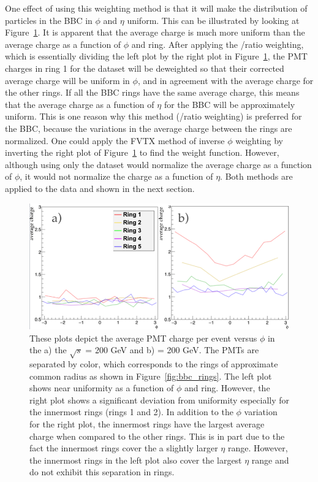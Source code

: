 One effect of using this weighting method is that it will make the distribution of particles in the BBC in $\phi$ and $\eta $ uniform. This can be illustrated by looking at Figure~\ref{fig:bbc_pmt_phi_pp_pau}. It is apparent that the \pp average charge is much more uniform than the \pau average charge as a function of $\phi$ and ring. After applying the \pp/\pau ratio weighting, which is essentially dividing the left plot by the right plot in Figure~\ref{fig:bbc_pmt_phi_pp_pau}, the PMT charges in ring 1 for the \pau dataset will be deweighted so that their corrected average charge will be uniform in $\phi$, and in agreement with the average charge for the other rings. If all the BBC rings have the same average charge, this means that the average charge as a function of $\eta$ for the BBC will be approximately uniform. This is one reason why this method (\pp/\pau ratio weighting) is preferred for the BBC, because the variations in the average charge between the rings are normalized. One could apply the FVTX method of inverse $\phi$ weighting by inverting the right plot of Figure~\ref{fig:bbc_pmt_phi_pp_pau} to find the weight function. However, although using only the \pau dataset would normalize the average charge as a function of $\phi$, it would not normalize the charge as a function of $\eta$. Both methods are applied to the data and shown in the next section.

\begin{figure}[!ht]
\begin{center}
\includegraphics[width=0.75\linewidth]{figs/pp_pau_bbc_comparison.png}
\caption{These plots depict the average PMT charge per event versus $\phi$ in the a) the \pp $\sqrt{s}$ = 200 GeV and b) \pau \sqsn = 200 GeV. The PMTs are separated by color, which corresponds to the rings of approximate common radius as shown in Figure~\ref{fig:bbc_rings}. The left plot shows near uniformity as a function of $\phi$ and ring. However, the right plot shows a significant deviation from uniformity especially for the innermost rings (rings 1 and 2). In addition to the $\phi$ variation for the right plot, the innermost rings have the largest average charge when compared to the other rings. This is in part due to the fact the innermost rings cover the a slightly larger $\eta$ range. However, the innermost rings in the left plot also cover the largest $\eta$ range and do not exhibit this separation in rings. }
\label{fig:bbc_pmt_phi_pp_pau}
\end{center}
\end{figure}

